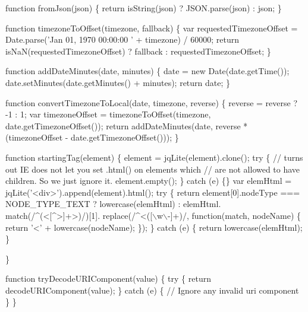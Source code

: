 \begin{DoxyCodeInclude}
\textcolor{keyword}{function} fromJson(json) \{
  \textcolor{keywordflow}{return} isString(json)
      ? JSON.parse(json)
      : json;
\}


\textcolor{keyword}{function} timezoneToOffset(timezone, fallback) \{
  var requestedTimezoneOffset = Date.parse(\textcolor{stringliteral}{'Jan 01, 1970 00:00:00 '} + timezone) / 60000;
  \textcolor{keywordflow}{return} isNaN(requestedTimezoneOffset) ? fallback : requestedTimezoneOffset;
\}


\textcolor{keyword}{function} addDateMinutes(date, minutes) \{
  date = \textcolor{keyword}{new} Date(date.getTime());
  date.setMinutes(date.getMinutes() + minutes);
  \textcolor{keywordflow}{return} date;
\}


\textcolor{keyword}{function} convertTimezoneToLocal(date, timezone, reverse) \{
  reverse = reverse ? -1 : 1;
  var timezoneOffset = timezoneToOffset(timezone, date.getTimezoneOffset());
  \textcolor{keywordflow}{return} addDateMinutes(date, reverse * (timezoneOffset - date.getTimezoneOffset()));
\}


\textcolor{keyword}{function} startingTag(element) \{
  element = jqLite(element).clone();
  \textcolor{keywordflow}{try} \{
    \textcolor{comment}{// turns out IE does not let you set .html() on elements which}
    \textcolor{comment}{// are not allowed to have children. So we just ignore it.}
    element.empty();
  \} \textcolor{keywordflow}{catch} (e) \{\}
  var elemHtml = jqLite(\textcolor{stringliteral}{'<div>'}).append(element).html();
  \textcolor{keywordflow}{try} \{
    \textcolor{keywordflow}{return} element[0].nodeType === NODE\_TYPE\_TEXT ? lowercase(elemHtml) :
        elemHtml.
          match(/^(<[^>]+>)/)[1].
          replace(/^<([\(\backslash\)w\(\backslash\)-]+)/, \textcolor{keyword}{function}(match, nodeName) \{ \textcolor{keywordflow}{return} \textcolor{charliteral}{'<'} + lowercase(nodeName); \});
  \} \textcolor{keywordflow}{catch} (e) \{
    \textcolor{keywordflow}{return} lowercase(elemHtml);
  \}

\}



\textcolor{keyword}{function} tryDecodeURIComponent(value) \{
  \textcolor{keywordflow}{try} \{
    \textcolor{keywordflow}{return} decodeURIComponent(value);
  \} \textcolor{keywordflow}{catch} (e) \{
    \textcolor{comment}{// Ignore any invalid uri component}
  \}
\}



\end{DoxyCodeInclude}
